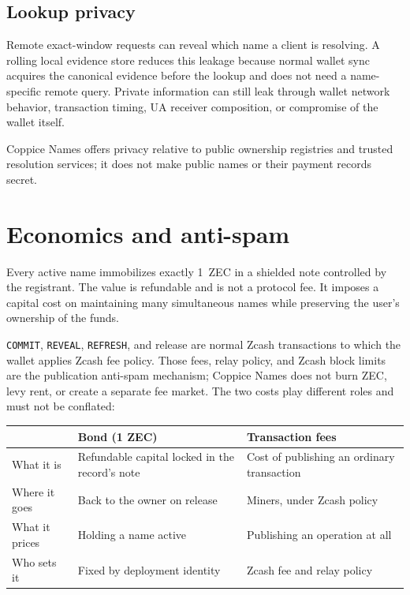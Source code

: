 \documentclass[11pt]{article}
\newcommand{\operation}[1]{\texttt{#1}}
\begin{document}
\subsection{Lookup privacy}

Remote exact-window requests can reveal which name a client is resolving. A
rolling local evidence store reduces this leakage because normal wallet sync
acquires the canonical evidence before the lookup and does not need a
name-specific remote query. Private information can still leak through
wallet network behavior, transaction timing, UA receiver composition, or
compromise of the wallet itself.

Coppice Names offers privacy relative to public ownership registries and
trusted resolution services; it does not make public names or their payment
records secret.

\section{Economics and anti-spam}
\label{sec:economics}

Every active name immobilizes exactly 1~ZEC in a shielded note controlled by
the registrant. The value is refundable and is not a protocol fee. It imposes
a capital cost on maintaining many simultaneous names while preserving the
user's ownership of the funds.

\operation{COMMIT}, \operation{REVEAL}, \operation{REFRESH}, and release are
normal Zcash transactions to which the wallet applies Zcash fee policy. Those
fees, relay policy, and Zcash block limits are the publication anti-spam
mechanism; Coppice Names does not burn ZEC, levy rent, or create a separate
fee market. The two costs play different roles and must not be conflated:

\begin{center}
\small
\begin{tabular}{>{\raggedright\arraybackslash}p{}>{\raggedright\arraybackslash}p{}>{\raggedright\arraybackslash}p{}}
\toprule
 & Bond (1 ZEC) & Transaction fees \\
\midrule
What it is & Refundable capital locked in the record's note & Cost of publishing an ordinary transaction \\
Where it goes & Back to the owner on release & Miners, under Zcash policy \\
What it prices & Holding a name active & Publishing an operation at all \\
Who sets it & Fixed by deployment identity & Zcash fee and relay policy \\
\bottomrule
\end{tabular}
\end{center}
\end{document}
